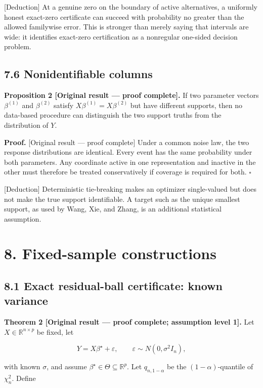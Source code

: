 \documentclass[
  english,
  11pt,
  a4paper,
]{article}
\begin{document}
{[}Deduction{]} At a genuine zero on the boundary of active
alternatives, a uniformly honest exact-zero certificate can succeed with
probability no greater than the allowed familywise error. This is
stronger than merely saying that intervals are wide: it identifies
exact-zero certification as a nonregular one-sided decision problem.

\subsection{7.6 Nonidentifiable columns}\label{nonidentifiable-columns}

\textbf{Proposition 2 {[}Original result --- proof complete{]}.} If two
parameter vectors $\beta^{(1)}$ and $\beta^{(2)}$ satisfy
$X\beta^{(1)}=X\beta^{(2)}$ but have different supports, then no
data-based procedure can distinguish the two support truths from the
distribution of $Y$.

\textbf{Proof.} {[}Original result --- proof complete{]} Under a common
noise law, the two response distributions are identical. Every event has
the same probability under both parameters. Any coordinate active in one
representation and inactive in the other must therefore be treated
conservatively if coverage is required for both. $\square$

{[}Deduction{]} Deterministic tie-breaking makes an optimizer
single-valued but does not make the true support identifiable. A target
such as the unique smallest support, as used by Wang, Xie, and Zhang, is
an additional statistical assumption.

\section{8. Fixed-sample
constructions}\label{fixed-sample-constructions}

\subsection{8.1 Exact residual-ball certificate: known
variance}\label{exact-residual-ball-certificate-known-variance}

\textbf{Theorem 2 {[}Original result --- proof complete; assumption
level 1{]}.} Let $X\in\mathbb R^{n\times p}$ be fixed, let

$$
Y=X\beta^\star+\varepsilon,
\qquad
\varepsilon\sim N(0,\sigma^2I_n),
$$

with known $\sigma$, and assume
$\beta^\star\in\Theta\subseteq\mathbb R^p$. Let $q_{n,1-\alpha}$ be
the $(1-\alpha)$-quantile of $\chi_n^2$. Define
\end{document}
